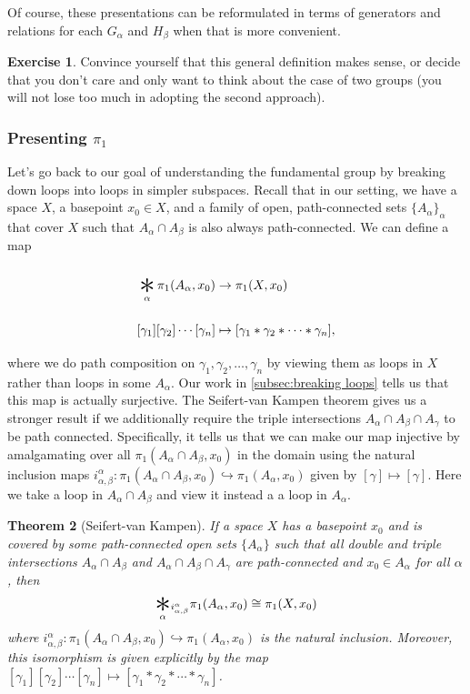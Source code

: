 \documentclass{article}
\newtheorem{thm}{Theorem}[section]
\theoremstyle{definition}
\newtheorem{exer}[thm]{Exercise}
\theoremstyle{remark}
\numberwithin{figure}{section}
\DeclareMathOperator*{\bigast}{\vcenter{\hbox{\Huge$\ast$}}}
\begin{document}
Of course, these presentations can be reformulated in terms of generators and relations for each $G_\alpha$ and $H_\beta$ when that is more convenient.

\begin{exer}
	Convince yourself that this general definition makes sense, or decide that you don't care and only want to think about the case of two groups (you will not lose too much in adopting the second approach).
\end{exer}

\subsubsection{Presenting $\pi_1$}
Let's go back to our goal of understanding the fundamental group by breaking down loops into loops in simpler subspaces. Recall that in our setting, we have a space $X$, a basepoint $x_0 \in X$, and a family of open, path-connected sets $\{A_\alpha\}_\alpha$ that cover $X$ such that $A_\alpha \cap A_\beta$ is also always path-connected. We can define a map 
\begin{align*}
	\bigast_\alpha \pi_1(A_\alpha, x_0) &\to \pi_1(X, x_0)\\
	[\gamma_1] [\gamma_2] \cdots [\gamma_n] &\mapsto [\gamma_1 * \gamma_2 * \cdots * \gamma_n],
\end{align*}
where we do path composition on $\gamma_1, \gamma_2, \ldots, \gamma_n$ by viewing them as loops in $X$ rather than loops in some $A_\alpha$. Our work in \cref{subsec:breaking loops} tells us that this map is actually surjective. The Seifert-van Kampen theorem gives us a stronger result if we additionally require the triple intersections $A_\alpha \cap A_\beta \cap A_\gamma$ to be path connected. Specifically, it tells us that we can make our map injective by amalgamating over all $\pi_1(A_\alpha \cap A_\beta, x_0)$ in the domain using the natural inclusion maps $i_{\alpha, \beta}^\alpha : \pi_1(A_\alpha \cap A_\beta, x_0) \hookrightarrow \pi_1(A_\alpha, x_0)$ given by $[\gamma] \mapsto [\gamma]$. Here we take a loop in $A_\alpha \cap A_\beta$ and view it instead a a loop in $A_\alpha$.

\begin{thm}[Seifert-van Kampen]
	If a space $X$ has a basepoint $x_0$ and is covered by some path-connected open sets $\{A_\alpha\}$ such that all double and triple intersections $A_\alpha \cap A_\beta$ and $A_\alpha \cap A_\beta \cap A_\gamma$ are path-connected and $x_0 \in A_\alpha$ for all $\alpha$, then
	\[
	\bigast_\alpha\!_{i_{\alpha, \beta}^\alpha} \pi_1(A_\alpha, x_0) \cong \pi_1(X, x_0)
	\]
	where $i_{\alpha, \beta}^\alpha : \pi_1(A_\alpha \cap A_\beta, x_0) \hookrightarrow \pi_1(A_\alpha, x_0)$ is the natural inclusion. Moreover, this isomorphism is given explicitly by the map $[\gamma_1] [\gamma_2] \cdots [\gamma_n] \mapsto [\gamma_1 * \gamma_2 * \cdots * \gamma_n]$.
\end{thm}
\end{document}

